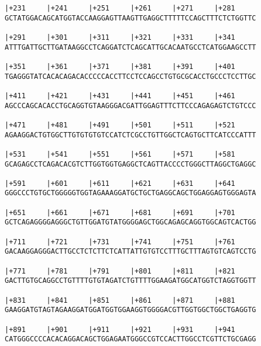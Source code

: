 \documentclass{article}
\begin{document}
\begin{Verbatim}
|+231     |+241     |+251     |+261     |+271     |+281     
GCTATGGACAGCATGGTACCAAGGAGTTAAGTTGAGGCTTTTTCCAGCTTTCTCTGGTTC
                                                            
|+291     |+301     |+311     |+321     |+331     |+341     
ATTTGATTGCTTGATAAGGCCTCAGGATCTCAGCATTGCACAATGCCTCATGGAAGCCTT
                                                            
|+351     |+361     |+371     |+381     |+391     |+401     
TGAGGGTATCACACAGACACCCCCACCTTCCTCCAGCCTGTGCGCACCTGCCCTCCTTGC
                                                            
|+411     |+421     |+431     |+441     |+451     |+461     
AGCCCAGCACACCTGCAGGTGTAAGGGACGATTGGAGTTTCTTCCCAGAGAGTCTGTCCC
                                                            
|+471     |+481     |+491     |+501     |+511     |+521     
AGAAGGACTGTGGCTTGTGTGTGTCCATCTCGCCTGTTGGCTCAGTGCTTCATCCCATTT
                                                            
|+531     |+541     |+551     |+561     |+571     |+581     
GCAGAGCCTCAGACACGTCTTGGTGGTGAGGCTCAGTTACCCCTGGGCTTAGGCTGAGGC
                                                            
|+591     |+601     |+611     |+621     |+631     |+641     
GGGCCCTGTGCTGGGGGTGGTAGAAAGGATGCTGCTGAGGCAGCTGGAGGAGTGGGAGTA
                                                            
|+651     |+661     |+671     |+681     |+691     |+701     
GCTCAGAGGGGAGGGCTGTTGGATGTATGGGGAGCTGGCAGAGCAGGTGGCAGTCACTGG
                                                            
|+711     |+721     |+731     |+741     |+751     |+761     
GACAAGGAGGGACTTGCCTCTCTTCTCATTATTGTGTCCTTTGCTTTAGTGTCAGTCCTG
                                                            
|+771     |+781     |+791     |+801     |+811     |+821     
GACTTGTGCAGGCCTGTTTTGTGTAGATCTGTTTTGGAAGATGGCATGGTCTAGGTGGTT
                                                            
|+831     |+841     |+851     |+861     |+871     |+881     
GAAGGATGTAGTAGAAGGATGGATGGTGGAAGGTGGGGACGTTGGTGGCTGGCTGAGGTG
                                                            
|+891     |+901     |+911     |+921     |+931     |+941     
CATGGGCCCCACACAGGACAGCTGGAGAATGGGCCGTCCACTTGGCCTCGTTCTGCGAGG
                                                            

\end{Verbatim}
\end{document}

